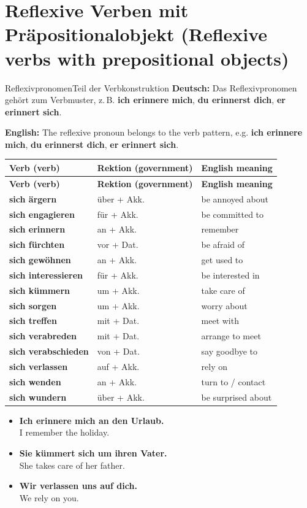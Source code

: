 \documentclass[a4paper,11pt]{article}
\newcommand{\GermanText}[1]{\textbf{Deutsch: }#1\par}
\newcommand{\EnglishText}[1]{{\small\color{SoftGray}\textbf{English: }#1\par}}
\newcommand{\ExampleItem}[2]{\item \textbf{#1}\\{\small\color{SoftGray}#2}}
\begin{document}
\section{Reflexive Verben mit Präpositionalobjekt (Reflexive verbs with prepositional objects)}
\begin{grammarentry}{Reflexivpronomen}{Teil der Verbkonstruktion}
\GermanText{Das Reflexivpronomen gehört zum Verbmuster, z.\,B. \textbf{ich erinnere mich}, \textbf{du erinnerst dich}, \textbf{er erinnert sich}.}
\EnglishText{The reflexive pronoun belongs to the verb pattern, e.g. \textbf{ich erinnere mich}, \textbf{du erinnerst dich}, \textbf{er erinnert sich}.}
\end{grammarentry}
\begin{longtable}{>{\raggedright\arraybackslash}p{} >{\raggedright\arraybackslash}p{} >{\raggedright\arraybackslash}p{}}
\rowcolor{HeaderBlueDark}
\color{white}\textbf{Verb (verb)} & \color{white}\textbf{Rektion (government)} & \color{white}\textbf{English meaning}\\
\endfirsthead
\rowcolor{HeaderBlueDark}
\color{white}\textbf{Verb (verb)} & \color{white}\textbf{Rektion (government)} & \color{white}\textbf{English meaning}\\
\endhead
\textbf{sich ärgern} & über + Akk. & be annoyed about\\
\textbf{sich engagieren} & für + Akk. & be committed to\\
\textbf{sich erinnern} & an + Akk. & remember\\
\textbf{sich fürchten} & vor + Dat. & be afraid of\\
\textbf{sich gewöhnen} & an + Akk. & get used to\\
\textbf{sich interessieren} & für + Akk. & be interested in\\
\textbf{sich kümmern} & um + Akk. & take care of\\
\textbf{sich sorgen} & um + Akk. & worry about\\
\textbf{sich treffen} & mit + Dat. & meet with\\
\textbf{sich verabreden} & mit + Dat. & arrange to meet\\
\textbf{sich verabschieden} & von + Dat. & say goodbye to\\
\textbf{sich verlassen} & auf + Akk. & rely on\\
\textbf{sich wenden} & an + Akk. & turn to / contact\\
\textbf{sich wundern} & über + Akk. & be surprised about\\
\end{longtable}
\begin{exbox}
\begin{itemize}
\ExampleItem{Ich erinnere mich an den Urlaub.}{I remember the holiday.}
\ExampleItem{Sie kümmert sich um ihren Vater.}{She takes care of her father.}
\ExampleItem{Wir verlassen uns auf dich.}{We rely on you.}
\end{itemize}
\end{exbox}
\end{document}
